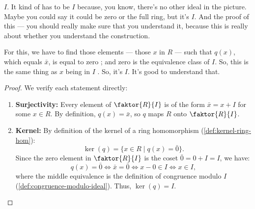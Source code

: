 \begin{speech}[00:06:17 - 00:07:05]
$I$. It kind of has to be $I$  because, you know, there's no other ideal in the picture. Maybe you could say it could be zero or the full ring, but it's $I$. And the proof of this --- you should really make sure that you understand it, because this is really about whether you understand the construction.

For this, we have to find those elements  --- those $x$ in $R$ --- such that $q(x)$, which equals $\bar{x}$, is equal to zero ; and zero is the equivalence class of $I$. So, this is the same thing as $x$ being in $I$ . So, it's $I$. It's good to understand that.
\end{speech}

\begin{content}

\begin{proof}
We verify each statement directly:
\begin{enumerate}[label=\textbf{(\roman*)}]
    \item \textbf{Surjectivity:} Every element of $\faktor{R}{I}$ is of the form $\bar{x} = x + I$ for some $x \in R$. By definition, $q(x) = \bar{x}$, so $q$ maps $R$ onto $\faktor{R}{I}$.
    \item \textbf{Kernel:} By definition of the kernel of a ring homomorphism (\cref{def:kernel-ring-hom}):
    \[
    \ker(q) = \{ x \in R \mid q(x) = \bar{0} \}.
    \]
    Since the zero element in $\faktor{R}{I}$ is the coset $\bar{0} = 0 + I = I$, we have:
    \[
    q(x) = \bar{0} \iff \bar{x} = \bar{0} \iff x - 0 \in I \iff x \in I,
    \]
    where the middle equivalence is the definition of congruence modulo $I$ (\cref{def:congruence-modulo-ideal}).
    Thus, $\ker(q) = I$.
\end{enumerate}
\end{proof}
\end{content}

